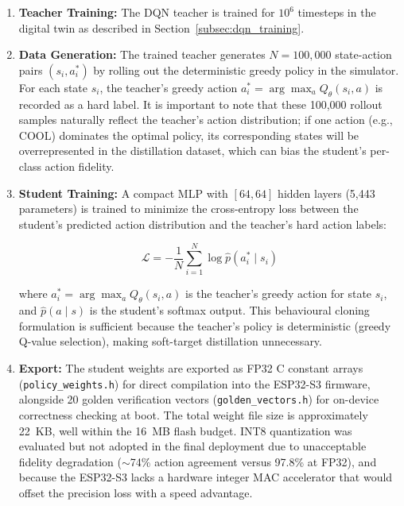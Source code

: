     \begin{enumerate}
        \item \textbf{Teacher Training:} The DQN teacher is trained for $10^6$ timesteps in the digital twin as described in Section~\ref{subsec:dqn_training}.

        \item \textbf{Data Generation:} The trained teacher generates $N = 100{,}000$ state-action pairs $(s_i, a_i^{*})$ by rolling out the deterministic greedy policy in the simulator. For each state $s_i$, the teacher's greedy action $a_i^{*} = \arg\max_a Q_{\theta}(s_i, a)$ is recorded as a hard label. It is important to note that these 100,000 rollout samples naturally reflect the teacher's action distribution; if one action (e.g., COOL) dominates the optimal policy, its corresponding states will be overrepresented in the distillation dataset, which can bias the student's per-class action fidelity.

        \item \textbf{Student Training:} A compact MLP with $[64, 64]$ hidden layers (5,443 parameters) is trained to minimize the cross-entropy loss between the student's predicted action distribution and the teacher's hard action labels:

        \begin{equation}
            \mathcal{L} = -\frac{1}{N}\sum_{i=1}^{N} \log \hat{p}(a_i^{*} \mid s_i)
            \label{eq:distill_loss}
        \end{equation}

        \noindent where $a_i^{*} = \arg\max_a Q_{\theta}(s_i, a)$ is the teacher's greedy action for state $s_i$, and $\hat{p}(a \mid s)$ is the student's softmax output. This behavioural cloning formulation is sufficient because the teacher's policy is deterministic (greedy Q-value selection), making soft-target distillation unnecessary.

        \item \textbf{Export:} The student weights are exported as FP32 C constant arrays (\texttt{policy\_weights.h}) for direct compilation into the ESP32-S3 firmware, alongside 20 golden verification vectors (\texttt{golden\_vectors.h}) for on-device correctness checking at boot. The total weight file size is approximately 22~KB, well within the 16~MB flash budget. INT8 quantization was evaluated but not adopted in the final deployment due to unacceptable fidelity degradation ($\sim$74\% action agreement versus 97.8\% at FP32), and because the ESP32-S3 lacks a hardware integer MAC accelerator that would offset the precision loss with a speed advantage.
    \end{enumerate}

